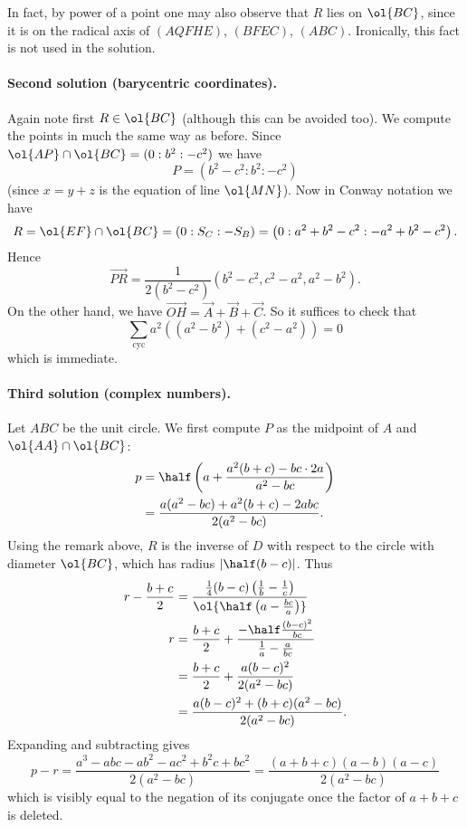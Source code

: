 \documentclass[11pt]{scrartcl}
\begin{document}
\begin{remark*}
  In fact, by power of a point one may also observe
  that $R$ lies on $\ol{BC}$,
  since it is on the radical axis of $(AQFHE)$, $(BFEC)$, $(ABC)$.
  Ironically, this fact is not used in the solution.
\end{remark*}

\paragraph{Second solution (barycentric coordinates).}
Again note first $R \in \ol{BC}$ (although this can be avoided too).
We compute the points in much the same way as before.
Since $\ol{AP} \cap \ol{BC} = (0 : b^2 : -c^2)$
we have \[ P = \left( b^2-c^2 : b^2 : -c^2  \right) \]
(since $x=y+z$ is the equation of line $\ol{MN}$).
Now in Conway notation we have
\[ R = \ol{EF} \cap \ol{BC} = (0 : S_C : -S_B)
  =\left( 0 : a^2+b^2-c^2 : -a^2+b^2-c^2 \right). \]
Hence
\[ \overrightarrow{PR}
  = \frac{1}{2(b^2-c^2)} \left( b^2-c^2 , c^2-a^2 , a^2-b^2 \right).  \]
On the other hand, we have
$\overrightarrow{OH} = \vec A + \vec B + \vec C$.
So it suffices to check that
\[ \sum_{\text{cyc}} a^2\left( (a^2-b^2) + (c^2-a^2) \right) = 0 \]
which is immediate.

\paragraph{Third solution (complex numbers).}
Let $ABC$ be the unit circle.
We first compute $P$ as the midpoint of $A$ and $\ol{AA} \cap \ol{BC}$:
\begin{align*}
  p &= \half \left( a + \frac{a^2(b+c)-bc\cdot2a}{a^2-bc} \right) \\
  &= \frac{a(a^2-bc)+a^2(b+c)-2abc}{2(a^2-bc)}.
\end{align*}
Using the remark above, $R$ is the inverse of $D$ with
respect to the circle with diameter $\ol{BC}$,
which has radius $\left\lvert \half(b-c) \right\rvert$.
Thus
\begin{align*}
  r - \frac{b+c}{2}
  &= \frac{\frac14(b-c)\left( \frac1b-\frac1c \right)}%
  {\ol{\half\left( a-\frac{bc}{a} \right)}} \\
  r &= \frac{b+c}{2}
  + \frac{-\half \frac{(b-c)^2}{bc}}{\frac1a-\frac{a}{bc}} \\
  &= \frac{b+c}{2} + \frac{a(b-c)^2}{2(a^2-bc)} \\
  &= \frac{a(b-c)^2+(b+c)(a^2-bc)}{2(a^2-bc)}.
\end{align*}
Expanding and subtracting gives
\[ p-r = \frac{a^3-abc-ab^2-ac^2+b^2c+bc^2}{2(a^2-bc)}
  = \frac{(a+b+c)(a-b)(a-c)}{2(a^2-bc)} \]
which is visibly equal to the negation of its conjugate
once the factor of $a+b+c$ is deleted.
\end{document}
